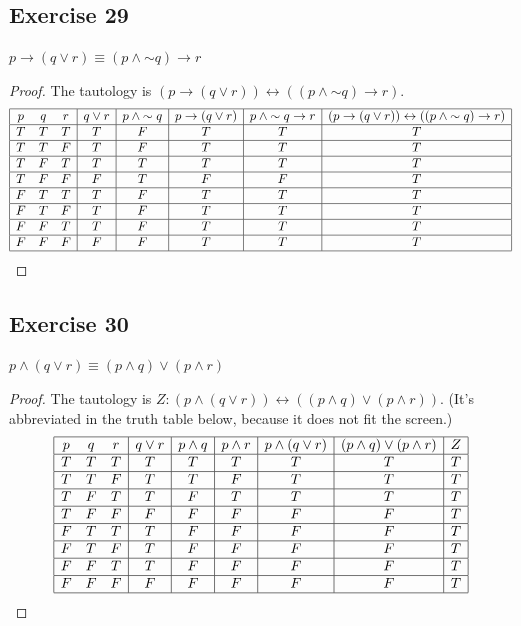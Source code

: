 \documentclass[14pt]{extarticle}
\newcommand{\bic}{\leftrightarrow}
\begin{document}
\subsection{Exercise 29}
$p \to (q \vee r) \equiv (p \wedge {\sim q}) \to r$
\begin{proof} The tautology is $(p \to (q \vee r)) \bic ((p \wedge {\sim q}) \to
r)$. $$ \begin{array}{|ccc|c|c|c|c|c|c|} \hline p & q & r & q \vee r & p \wedge
{\sim q} & p \to (q \vee r) & p \wedge {\sim q} \to r & (p \to (q \vee r)) \bic
((p \wedge {\sim q}) \to r) \\ \hline T & T & T & T & F & T & T & T \\ \hline T
& T & F & T & F & T & T & T \\ \hline T & F & T & T & T & T & T & T \\ \hline T
& F & F & F & T & F & F & T \\ \hline F & T & T & T & F & T & T & T \\ \hline F
& T & F & T & F & T & T & T \\ \hline F & F & T & T & F & T & T & T \\ \hline F
& F & F & F & F & T & T & T \\ \hline \end{array} $$ \end{proof}

\subsection{Exercise 30}
$p \wedge (q \vee r) \equiv (p \wedge q) \vee (p \wedge r)$

\begin{proof}
The tautology is $Z: (p \wedge (q \vee r)) \bic ((p \wedge q) \vee
(p \wedge r))$. (It's abbreviated in the truth table below, because it does not
fit the screen.)
$$
\begin{array}{|ccc|c|c|c|c|c|c|}
\hline
p & q & r & q \vee r & p \wedge q & p \wedge r & p \wedge (q \vee r) & (p \wedge q) \vee (p \wedge r) & Z \\
\hline
T & T & T & T & T & T & T & T & T \\
\hline
T & T & F & T & T & F & T & T & T \\
\hline
T & F & T & T & F & T & T & T & T \\
\hline
T & F & F & F & F & F & F & F & T \\
\hline
F & T & T & T & F & F & F & F & T \\
\hline
F & T & F & T & F & F & F & F & T \\
\hline
F & F & T & T & F & F & F & F & T \\
\hline
F & F & F & F & F & F & F & F & T \\
\hline
\end{array}
$$
\end{proof}
\end{document}
